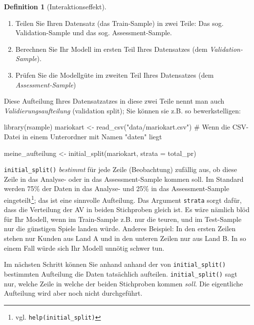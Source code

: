 \documentclass[
  letterpaper,
]{scrbook}
\newenvironment{Shaded}{\begin{snugshade}}{\end{snugshade}}
\newcommand{\AttributeTok}[1]{\textcolor[rgb]{0.40,0.45,0.13}{#1}}
\newcommand{\CommentTok}[1]{\textcolor[rgb]{0.37,0.37,0.37}{#1}}
\newcommand{\FunctionTok}[1]{\textcolor[rgb]{0.28,0.35,0.67}{#1}}
\newcommand{\NormalTok}[1]{\textcolor[rgb]{0.00,0.23,0.31}{#1}}
\newcommand{\OtherTok}[1]{\textcolor[rgb]{0.00,0.23,0.31}{#1}}
\newcommand{\StringTok}[1]{\textcolor[rgb]{0.13,0.47,0.30}{#1}}
\providecommand{\tightlist}{%
  \setlength{\itemsep}{0pt}\setlength{\parskip}{0pt}}\usepackage{longtable,booktabs,array}
\theoremstyle{definition}
\theoremstyle{definition}
\theoremstyle{definition}
\newtheorem{definition}{Definition}[chapter]
\theoremstyle{remark}
\begin{document}
\begin{definition}[Interaktionseffekt]
\begin{enumerate}
\def\labelenumi{\arabic{enumi}.}
\tightlist
\item
  Teilen Sie Ihren Datensatz (das Train-Sample) in zwei Teile: Das sog.
  Validation-Sample und das sog. Assessment-Sample.
\item
  Berechnen Sie Ihr Modell im ersten Teil Ihres Datensatzes (dem
  \emph{Validation-Sample}).
\item
  Prüfen Sie die Modellgüte im zweiten Teil Ihres Datensatzes (dem
  \emph{Assessment-Sample})
\end{enumerate}

Diese Aufteilung Ihres Datensatzatzes in diese zwei Teile nennt man auch
\emph{Validierungsaufteilung} (validation split); Sie können sie z.B. so
bewerkstelligen:

\begin{Shaded}
\begin{Highlighting}[]
\FunctionTok{library}\NormalTok{(rsample)}
\NormalTok{mariokart }\OtherTok{\textless{}{-}} \FunctionTok{read\_csv}\NormalTok{(}\StringTok{"data/mariokart.csv"}\NormalTok{)  }\CommentTok{\# Wenn die CSV{-}Datei in einem Unterordner mit Namen "daten" liegt}

\NormalTok{meine\_aufteilung }\OtherTok{\textless{}{-}} \FunctionTok{initial\_split}\NormalTok{(mariokart, }\AttributeTok{strata =}\NormalTok{ total\_pr)}
\end{Highlighting}
\end{Shaded}

\texttt{initial\_split()} \emph{bestimmt} für jede Zeile (Beobachtung)
zufällig aus, ob diese Zeile in das Analyse- oder in das
Assessment-Sample kommen soll. Im Standard werden 75\% der Daten in das
Analyse- und 25\% in das Assessment-Sample eingeteilt\footnote{vgl.
  \texttt{help(initial\_split)}}; das ist eine sinnvolle Aufteilung. Das
Argument \texttt{strata} sorgt dafür, dass die Verteilung der AV in
beiden Stichproben gleich ist. Es wäre nämlich blöd für Ihr Modell, wenn
im Train-Sample z.B. nur die teuren, und im Test-Sample nur die
günstigen Spiele landen würde. Anderes Beispiel: In den ersten Zeilen
stehen nur Kunden aus Land A und in den unteren Zeilen nur aus Land B.
In so einem Fall würde sich Ihr Modell unnötig schwer tun.

Im nächsten Schritt können Sie anhand anhand der von
\texttt{initial\_split()} bestimmten Aufteilung die Daten tatsächlich
aufteilen. \texttt{initial\_split()} sagt nur, welche Zeile in welche
der beiden Stichproben kommen \emph{soll}. Die eigentliche Aufteilung
wird aber noch nicht durchgeführt.


\end{definition}
\end{document}
